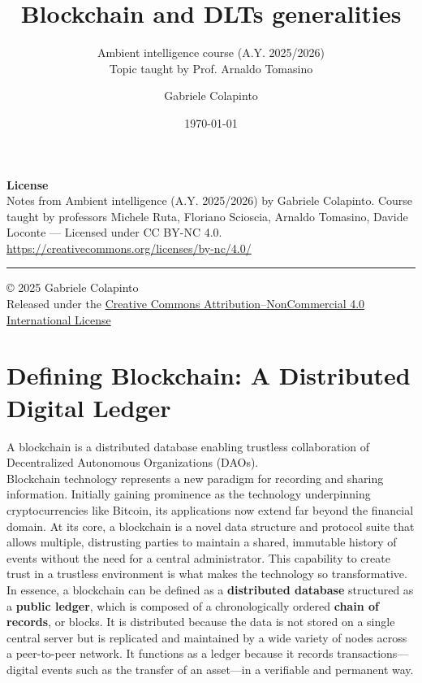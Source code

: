 \documentclass{scrbook}
\title{Blockchain and DLTs generalities}
\subtitle{Ambient intelligence course (A.Y. 2025/2026)\\Topic taught by Prof. Arnaldo Tomasino}
\author{Gabriele Colapinto}
\date{\today}
\begin{document}
\maketitle
\thispagestyle{empty}

{\Large\textbf{License}} \\
{Notes from Ambient intelligence (A.Y. 2025/2026) by Gabriele Colapinto. 
Course taught by professors Michele Ruta, Floriano Scioscia, Arnaldo Tomasino, Davide Loconte — 
Licensed under CC BY-NC 4.0.\\
\url{https://creativecommons.org/licenses/by-nc/4.0/}}

\vspace*{\fill}
\rule{\textwidth}{0.2pt}
\small{© 2025 Gabriele Colapinto \\
Released under the \href{https://creativecommons.org/licenses/by-nc/4.0/}{Creative Commons Attribution–NonCommercial 4.0 International License}}

\clearpage

\tableofcontents

\chapter{Defining Blockchain: A Distributed Digital Ledger}

A blockchain is a distributed database enabling trustless collaboration of Decentralized Autonomous Organizations (DAOs). \\

Blockchain technology represents a new paradigm for recording and sharing information. Initially gaining prominence as the technology underpinning cryptocurrencies like Bitcoin, its applications now extend far beyond the financial domain. At its core, a blockchain is a novel data structure and protocol suite that allows multiple, distrusting parties to maintain a shared, immutable history of events without the need for a central administrator. This capability to create trust in a trustless environment is what makes the technology so transformative. \\

In essence, a blockchain can be defined as a \textbf{distributed database} structured as a \textbf{public ledger}, which is composed of a chronologically ordered \textbf{chain of records}, or blocks. It is distributed because the data is not stored on a single central server but is replicated and maintained by a wide variety of nodes across a peer-to-peer network. It functions as a ledger because it records transactions—digital events such as the transfer of an asset—in a verifiable and permanent way. \\
\end{document}
